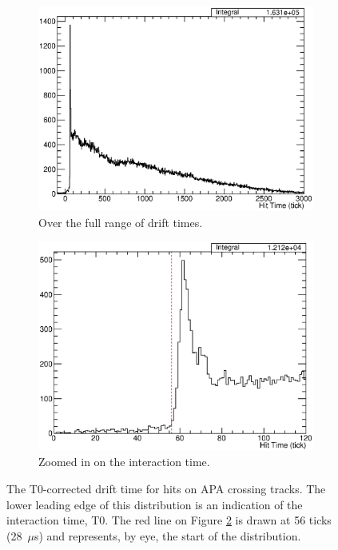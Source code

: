 \begin{figure}
  \centering
  \begin{subfigure}[t]{0.48\linewidth}
    \centering
    \includegraphics[width=\textwidth]{HitTimes.eps}
    \caption{Over the full range of drift times.}
    \label{fig:HitTimeRange}
  \end{subfigure}
  \hfill
  \begin{subfigure}[t]{0.48\linewidth}
    \centering
    \includegraphics[width=\textwidth]{HitTimesZoom.eps}
    \caption{Zoomed in on the interaction time.}
    \label{fig:HitTimeZoom}
  \end{subfigure}
  \caption[The T0-corrected drift time for hits on APA crossing tracks.]{The T0-corrected drift time for hits on APA crossing tracks.  The lower leading edge of this distribution is an indication of the interaction time, T0.  The red line on Figure \ref{fig:HitTimeZoom} is drawn at 56 ticks (28~$\mu$s) and represents, by eye, the start of the distribution.}
  \label{fig:HitTime}
\end{figure}

